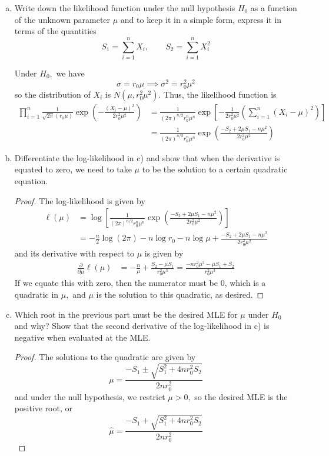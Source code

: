 \documentclass{article}
\begin{document}
\begin{itemize}
\begin{enumerate}[(a)]
			\item Write down the likelihood function under the null hypothesis $H_0$ as a function of the unknown parameter $\mu$ and to keep it in a simple form, express it in terms of the quantities \[S_1=\sum_{i=1}^{n} X_i, \quad \quad S_2=\sum_{i=1}^{n} X_i^2\] 
				\begin{soln}
					Under $H_0,$ we have \[\sigma=r_0\mu\implies \sigma^2=r_0^2\mu^2\] so the distribution of $X_i$ is $N\left( \mu, r_0^2\mu^2 \right).$ Thus, the likelihood function is 
					\begin{align*}
						\prod_{i=1}^{n} \frac{1}{\sqrt{2\pi}(r_0\mu)}\exp\left( -\frac{(X_i-\mu)^2}{2r_0^2\mu^2} \right) &= \frac{1}{(2\pi)^{n/2} r_0^n \mu^n}\exp\left[ -\frac{1}{2r_0^2\mu^2}\left( \sum_{i=1}^{n} (X_i-\mu)^2 \right) \right] \\
						&= \frac{1}{(2\pi)^{n/2} r_0^n \mu^n}\exp\left( \frac{-S_2+2\mu S_1-n\mu^2}{2r_0^2\mu^2} \right)
					\end{align*}
				\end{soln}

			\item Differentiate the log-likelihood in c) and show that when the derivative is equated to zero, we need to take $\mu$ to be the solution to a certain quadratic equation.
				\begin{proof}
					The log-likelihood is given by 
					\begin{align*}
						\ell(\mu) &= \log\left[ \frac{1}{(2\pi)^{n/2} r_0^n \mu^n}\exp\left( \frac{-S_2+2\mu S_1-n\mu^2}{2r_0^2\mu^2} \right) \right] \\
						&= -\frac{n}{2}\log(2\pi)-n\log r_0 - n\log \mu + \frac{-S_2+2\mu S_1-n\mu^2}{2r_0^2\mu^2}
					\end{align*}
					and its derivative with respect to $\mu$ is given by 
					\begin{align*}
						\frac{\partial}{\partial\mu}\ell(\mu) &= -\frac{n}{\mu} + \frac{S_2-\mu S_1}{r_0^2 \mu^3} = \frac{-nr_0^2 \mu^2 - \mu S_1 + S_2}{r_0^2 \mu^3}
					\end{align*}
					If we equate this with zero, then the numerator must be 0, which is a quadratic in $\mu,$ and $\mu$ is the solution to this quadratic, as desired.
				\end{proof}

			\item Which root in the previous part must be the desired MLE for $\mu$ under $H_0$ and why? Show that the second derivative of the log-likelihood in c) is negative when evaluated at the MLE.
				\begin{proof}
					The solutions to the quadratic are given by \[\mu=\frac{-S_1\pm \sqrt{S_1^2+4nr_0^2S_2}}{2nr_0^2}\] and under the null hypothesis, we restrict $\mu>0,$ so the desired MLE is the positive root, or \[\hat{\mu}=\frac{-S_1+\sqrt{S_1^2+4nr_0^2S_2}}{2nr_0^2}\]


\end{proof}
\end{enumerate}
\end{itemize}
\end{document}
